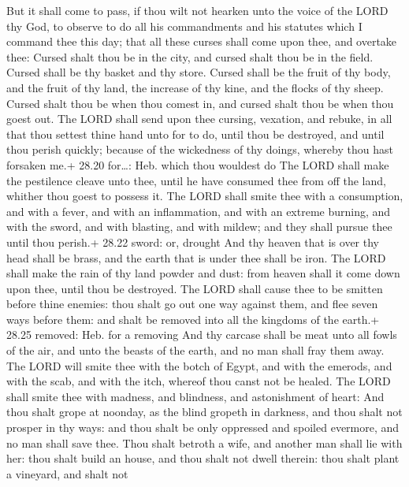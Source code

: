  But it shall come to pass, if thou wilt not hearken unto
the voice of the LORD thy God, to observe to do all his commandments and
his statutes which I command thee this day; that all these curses shall
come upon thee, and overtake thee:  Cursed shalt thou be in
the city, and cursed shalt thou be in the field.  Cursed
shall be thy basket and thy store.  Cursed shall be the
fruit of thy body, and the fruit of thy land, the increase of thy kine,
and the flocks of thy sheep.  Cursed shalt thou be when
thou comest in, and cursed shalt thou be when thou goest out.
 The LORD shall send upon thee cursing, vexation, and
rebuke, in all that thou settest thine hand unto for to do, until thou
be destroyed, and until thou perish quickly; because of the wickedness
of thy doings, whereby thou hast forsaken me.+ 28.20 for\ldots: Heb.
which thou wouldest do  The LORD shall make the pestilence
cleave unto thee, until he have consumed thee from off the land, whither
thou goest to possess it.  The LORD shall smite thee with a
consumption, and with a fever, and with an inflammation, and with an
extreme burning, and with the sword, and with blasting, and with mildew;
and they shall pursue thee until thou perish.+ 28.22 sword: or, drought
 And thy heaven that is over thy head shall be brass, and
the earth that is under thee shall be iron.  The LORD shall
make the rain of thy land powder and dust: from heaven shall it come
down upon thee, until thou be destroyed.  The LORD shall
cause thee to be smitten before thine enemies: thou shalt go out one way
against them, and flee seven ways before them: and shalt be removed into
all the kingdoms of the earth.+ 28.25 removed: Heb. for a removing
 And thy carcase shall be meat unto all fowls of the air,
and unto the beasts of the earth, and no man shall fray them away.
 The LORD will smite thee with the botch of Egypt, and with
the emerods, and with the scab, and with the itch, whereof thou canst
not be healed.  The LORD shall smite thee with madness, and
blindness, and astonishment of heart:  And thou shalt grope
at noonday, as the blind gropeth in darkness, and thou shalt not prosper
in thy ways: and thou shalt be only oppressed and spoiled evermore, and
no man shall save thee.  Thou shalt betroth a wife, and
another man shall lie with her: thou shalt build an house, and thou
shalt not dwell therein: thou shalt plant a vineyard, and shalt not
